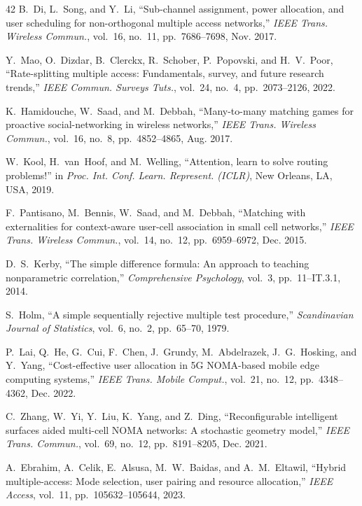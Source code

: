 \documentclass[journal]{IEEEtran}
\begin{document}
\begin{thebibliography}{42}
 B.~Di, L.~Song, and Y.~Li, ``Sub-channel assignment, power allocation, and user scheduling for non-orthogonal multiple access networks,'' \emph{IEEE Trans. Wireless Commun.}, vol.~16, no.~11, pp.~7686--7698, Nov. 2017.

 Y.~Mao, O.~Dizdar, B.~Clerckx, R.~Schober, P.~Popovski, and H.~V.~Poor, ``Rate-splitting multiple access: Fundamentals, survey, and future research trends,'' \emph{IEEE Commun. Surveys Tuts.}, vol.~24, no.~4, pp.~2073--2126, 2022.

 K.~Hamidouche, W.~Saad, and M.~Debbah, ``Many-to-many matching games for proactive social-networking in wireless networks,'' \emph{IEEE Trans. Wireless Commun.}, vol.~16, no.~8, pp.~4852--4865, Aug. 2017.

 W.~Kool, H.~van~Hoof, and M.~Welling, ``Attention, learn to solve routing problems!'' in \emph{Proc. Int. Conf. Learn. Represent. (ICLR)}, New Orleans, LA, USA, 2019.

 F.~Pantisano, M.~Bennis, W.~Saad, and M.~Debbah, ``Matching with externalities for context-aware user-cell association in small cell networks,'' \emph{IEEE Trans. Wireless Commun.}, vol.~14, no.~12, pp.~6959--6972, Dec. 2015.

 D.~S.~Kerby, ``The simple difference formula: An approach to teaching nonparametric correlation,'' \emph{Comprehensive Psychology}, vol.~3, pp.~11--IT.3.1, 2014.

 S.~Holm, ``A simple sequentially rejective multiple test procedure,'' \emph{Scandinavian Journal of Statistics}, vol.~6, no.~2, pp.~65--70, 1979.

 P.~Lai, Q.~He, G.~Cui, F.~Chen, J.~Grundy, M.~Abdelrazek, J.~G.~Hosking, and Y.~Yang, ``Cost-effective user allocation in 5G NOMA-based mobile edge computing systems,'' \emph{IEEE Trans. Mobile Comput.}, vol.~21, no.~12, pp.~4348--4362, Dec. 2022.

 C.~Zhang, W.~Yi, Y.~Liu, K.~Yang, and Z.~Ding, ``Reconfigurable intelligent surfaces aided multi-cell NOMA networks: A stochastic geometry model,'' \emph{IEEE Trans. Commun.}, vol.~69, no.~12, pp.~8191--8205, Dec. 2021.

 A.~Ebrahim, A.~Celik, E.~Alsusa, M.~W.~Baidas, and A.~M.~Eltawil, ``Hybrid multiple-access: Mode selection, user pairing and resource allocation,'' \emph{IEEE Access}, vol.~11, pp.~105632--105644, 2023.



\end{thebibliography}
\end{document}
